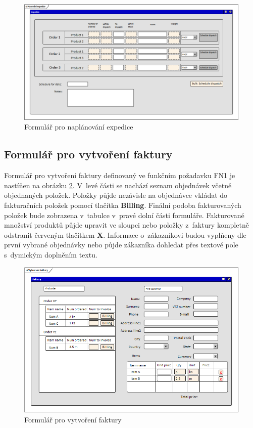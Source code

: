 \documentclass[thesis=B,czech]{FITthesis}[2012/06/26]
\begin{document}
\begin{figure}
	\includegraphics[width=\textwidth]{expedition_plan.png}
	\caption{Formulář pro naplánování expedice}\label{expedice}
\end{figure}

\subsection{Formulář pro vytvoření faktury}
	Formulář pro vytvoření faktury definovaný ve funkčním požadavku FN1 je nastíňen na obrázku \ref{faktura}. V~levé části se nachází seznam objednávek včetně objednaných položek. Položky půjde nezávisle na objednávce vkládat do fakturačních položek pomocí tlačítka \textbf{Billing}. Finální podoba fakturovaných položek bude zobrazena v~tabulce v~pravé dolní části formuláře. Fakturované množství produktů půjde upravit ve sloupci  nebo položky z~faktury kompletně odstranit červeným tlačítkem \textbf{X}. Informace o~zákazníkovi budou vyplňeny dle první vybrané objednávky nebo půjde zákazníka dohledat přes textové pole s~dymickým doplněním textu.

\begin{figure}
	\includegraphics[width=\textwidth]{invoice_form.png}
	\caption{Formulář pro vytvoření faktury}\label{faktura}
\end{figure}
\end{document}
